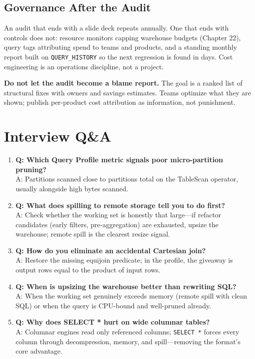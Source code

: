 \subsection{Governance After the Audit}
An audit that ends with a slide deck repeats annually. One that ends with controls does not: resource monitors capping warehouse budgets (Chapter 22), query tags attributing spend to teams and products, and a standing monthly report built on \texttt{QUERY\_HISTORY} so the next regression is found in days. Cost engineering is an operations discipline, not a project.

\begin{pitfall}
\textbf{Do not let the audit become a blame report.} The goal is a ranked list of structural fixes with owners and savings estimates. Teams optimize what they are shown; publish per-product cost attribution as information, not punishment.
\end{pitfall}

\section{Interview Q\&A}
\begin{enumerate}
    \item \textbf{Q: Which Query Profile metric signals poor micro-partition pruning?}\\
    A: Partitions scanned close to partitions total on the TableScan operator, usually alongside high bytes scanned.
    \item \textbf{Q: What does spilling to remote storage tell you to do first?}\\
    A: Check whether the working set is honestly that large---if refactor candidates (early filters, pre-aggregation) are exhausted, upsize the warehouse; remote spill is the clearest resize signal.
    \item \textbf{Q: How do you eliminate an accidental Cartesian join?}\\
    A: Restore the missing equijoin predicate; in the profile, the giveaway is output rows equal to the product of input rows.
    \item \textbf{Q: When is upsizing the warehouse better than rewriting SQL?}\\
    A: When the working set genuinely exceeds memory (remote spill with clean SQL) or when the query is CPU-bound and well-pruned already.
    \item \textbf{Q: Why does SELECT * hurt on wide columnar tables?}\\
    A: Columnar engines read only referenced columns; \texttt{SELECT *} forces every column through decompression, memory, and spill---removing the format's core advantage.
\end{enumerate}

